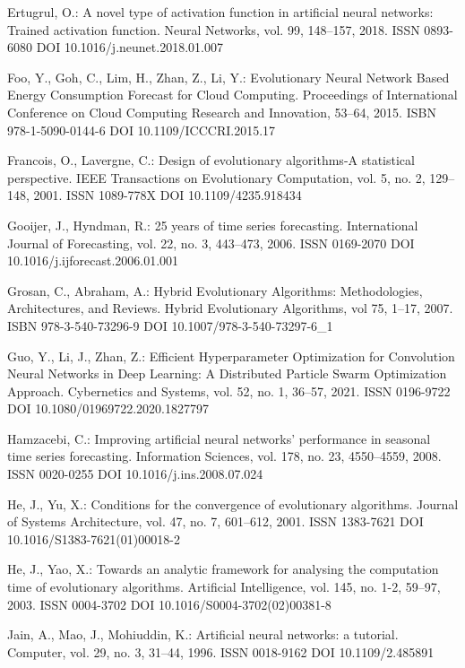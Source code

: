 \begin{thebibliography}{99.}
 Ertugrul, O.: A novel type of activation function in artificial neural networks: Trained activation function. Neural Networks, vol. 99, 148--157, 2018. ISSN 0893-6080 DOI 10.1016/j.neunet.2018.01.007

 Foo, Y., Goh, C., Lim, H., Zhan, Z., Li, Y.: Evolutionary Neural Network Based Energy Consumption Forecast for Cloud Computing. Proceedings of International Conference on Cloud Computing Research and Innovation, 53--64, 2015. ISBN 978-1-5090-0144-6 DOI 10.1109/ICCCRI.2015.17

 Francois, O., Lavergne, C.: Design of evolutionary algorithms-A statistical perspective. IEEE Transactions on Evolutionary Computation, vol. 5, no. 2, 129--148, 2001. ISSN 1089-778X DOI 10.1109/4235.918434

 Gooijer, J., Hyndman, R.: 25 years of time series forecasting. International Journal of Forecasting, vol. 22, no. 3, 443--473, 2006. ISSN 0169-2070 DOI 10.1016/j.ijforecast.2006.01.001

 Grosan, C., Abraham, A.: Hybrid Evolutionary Algorithms: Methodologies, Architectures, and Reviews. Hybrid Evolutionary Algorithms, vol 75, 1--17, 2007. ISBN 978-3-540-73296-9 DOI 10.1007/978-3-540-73297-6\_1

 Guo, Y., Li, J., Zhan, Z.: Efficient Hyperparameter Optimization for Convolution Neural Networks in Deep Learning: A Distributed Particle Swarm Optimization Approach. Cybernetics and Systems, vol. 52, no. 1, 36--57, 2021. ISSN 0196-9722 DOI 10.1080/01969722.2020.1827797

 Hamzacebi, C.: Improving artificial neural networks’ performance in seasonal time series forecasting. Information Sciences, vol. 178, no. 23, 4550--4559, 2008. ISSN 0020-0255 DOI 10.1016/j.ins.2008.07.024

 He, J., Yu, X.: Conditions for the convergence of evolutionary algorithms. Journal of Systems Architecture, vol. 47, no. 7, 601--612, 2001. ISSN 1383-7621 DOI 10.1016/S1383-7621(01)00018-2

 He, J., Yao, X.: Towards an analytic framework for analysing the computation time of evolutionary algorithms. Artificial Intelligence, vol. 145, no. 1-2, 59--97, 2003. ISSN 0004-3702 DOI 10.1016/S0004-3702(02)00381-8

 Jain, A., Mao, J., Mohiuddin, K.: Artificial neural networks: a tutorial. Computer, vol. 29, no. 3, 31--44, 1996. ISSN 0018-9162 DOI 10.1109/2.485891


\end{thebibliography}
